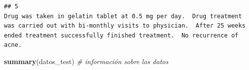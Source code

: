 \documentclass[spanish,]{article}
\newenvironment{Shaded}{\begin{snugshade}}{\end{snugshade}}
\newcommand{\KeywordTok}[1]{\textcolor[rgb]{0.13,0.29,0.53}{\textbf{#1}}}
\newcommand{\CommentTok}[1]{\textcolor[rgb]{0.56,0.35,0.01}{\textit{#1}}}
\newcommand{\NormalTok}[1]{#1}
\begin{document}
\begin{verbatim}
## 5                                                                                                                                                                                                                                                                                                                                                                                                                                                                                                                                                                                                                                                                                                                                                                                                                                                                                                                                                                                                                                 Drug was taken in gelatin tablet at 0.5 mg per day.  Drug treatment was carried out with bi-monthly visits to physician.  After 25 weeks ended treatment successfully finished treatment.  No recurrence of acne.
\end{verbatim}

\begin{Shaded}
\begin{Highlighting}[]
\KeywordTok{summary}\NormalTok{(datos_test) }\CommentTok{# información sobre los datos}
\end{Highlighting}
\end{Shaded}
\end{document}
